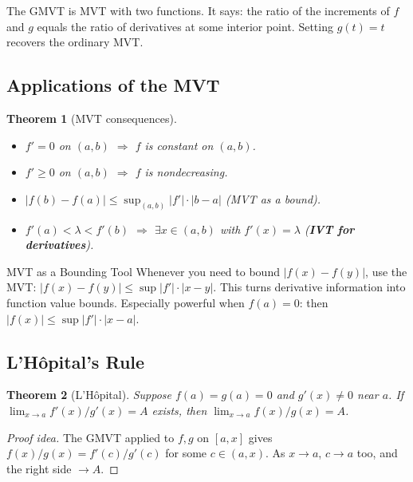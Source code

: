 \documentclass[11pt]{article}
\theoremstyle{myplain}
\newtheorem{theorem}{Theorem}[section]
\theoremstyle{definition}
\theoremstyle{remark}
\begin{document}
\begin{insight}
The GMVT is MVT with two functions. It says: the ratio of the increments of $f$ and $g$ equals the ratio of derivatives at some interior point. Setting $g(t) = t$ recovers the ordinary MVT.
\end{insight}

\subsection{Applications of the MVT}

\begin{theorem}[MVT consequences]
\begin{itemize}
  \item $f' = 0$ on $(a,b)$ $\Rightarrow$ $f$ is constant on $(a,b)$.
  \item $f' \geq 0$ on $(a,b)$ $\Rightarrow$ $f$ is nondecreasing.
  \item $|f(b) - f(a)| \leq \sup_{(a,b)}|f'| \cdot |b-a|$ \quad (MVT as a bound).
  \item $f'(a) < \lambda < f'(b)$ $\Rightarrow$ $\exists x \in (a,b)$ with $f'(x) = \lambda$ \quad (\textbf{IVT for derivatives}).
\end{itemize}
\end{theorem}

\begin{technique}{MVT as a Bounding Tool}
Whenever you need to bound $|f(x) - f(y)|$, use the MVT: $|f(x) - f(y)| \leq \sup|f'| \cdot |x-y|$. This turns derivative information into function value bounds. Especially powerful when $f(a) = 0$: then $|f(x)| \leq \sup|f'| \cdot |x - a|$.
\end{technique}

\subsection{L'H\^opital's Rule}

\begin{theorem}[L'H\^opital]
Suppose $f(a) = g(a) = 0$ and $g'(x) \neq 0$ near $a$. If $\lim_{x\to a} f'(x)/g'(x) = A$ exists, then $\lim_{x\to a} f(x)/g(x) = A$.
\end{theorem}

\begin{proof}[Proof idea]
The GMVT applied to $f, g$ on $[a, x]$ gives $f(x)/g(x) = f'(c)/g'(c)$ for some $c \in (a,x)$. As $x \to a$, $c \to a$ too, and the right side $\to A$.
\end{proof}
\end{document}
